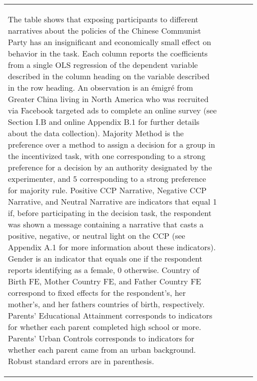{\begin{tabular}{l*{4}{c}}
{\begin{adjustwidth}{-1cm}{-1cm}             
    \begin{scriptsize}       
    The table shows that exposing participants to different narratives about the policies of the Chinese Communist Party has an insignificant and economically small effect on behavior in the task. Each column reports the coefficients from a single OLS regression of the dependent variable described in the column heading on the variable described in the row heading. An observation is an émigré from Greater China living in North America who was recruited via Facebook targeted ads to complete an online survey (see Section I.B and online Appendix B.1 for further details about the data collection). Majority Method is the preference over a method to assign a decision for a group in the incentivized task, with one corresponding to a strong preference for a decision by an authority designated by the experimenter, and 5 corresponding to a strong preference for majority rule.  Positive CCP Narrative, Negative CCP Narrative, and Neutral Narrative are indicators that equal 1 if, before participating in the decision task, the respondent was shown a message containing a narrative that casts a positive, negative, or neutral light on the CCP (see Appendix A.1 for more information about these indicators). Gender is an indicator that equals one if the respondent reports identifying as a female, 0 otherwise. Country of Birth FE, Mother Country FE, and Father Country FE correspond to fixed effects for the respondent's, her mother's, and her fathers countries of birth, respectively. Parents' Educational Attainment corresponds to indicators for whether each parent completed high school or more. Parents' Urban Controls corresponds to indicators for whether each parent came from an urban background. Robust standard errors are in parenthesis.             
    \end{scriptsize} 
\end{adjustwidth}

}
\end{tabular}}

